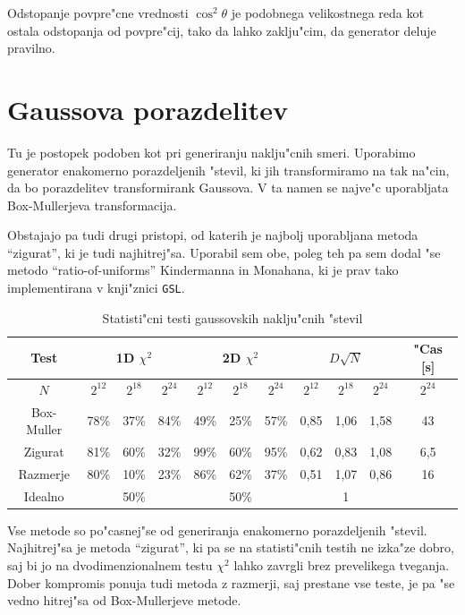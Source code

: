 \documentclass[a4paper,10pt]{article}
\begin{document}
Odstopanje povpre"cne vrednosti $\cos^2\theta$ je podobnega velikostnega reda kot ostala odstopanja od povpre"cij, tako da lahko zaklju"cim, da generator deluje pravilno. 

\section{Gaussova porazdelitev}

Tu je postopek podoben kot pri generiranju naklju"cnih smeri. Uporabimo generator enakomerno porazdeljenih "stevil, ki jih transformiramo na tak na"cin, da bo porazdelitev transformirank Gaussova. V ta namen se najve"c uporabljata Box-Mullerjeva transformacija.

Obstajajo pa tudi drugi pristopi, od katerih je najbolj uporabljana metoda ``zigurat'', ki je tudi najhitrej"sa. Uporabil sem obe, poleg teh pa sem dodal "se metodo ``ratio-of-uniforms'' Kindermanna in Monahana, ki je prav tako implementirana v knji"znici \texttt{GSL}. 

\begin{table}[h]
 \centering
  \begin{tabular}{|c|c|c|c|c|c|c|c|c|c|c|}
  \hline
  Test & \multicolumn{3}{|c|}{1D $\chi^2$} & \multicolumn{3}{|c|}{2D $\chi^2$} & \multicolumn{3}{|c|}{$D\sqrt{N}$} & "Cas [s]\\
  \hline
  $N$ & $2^{12}$ & $2^{18}$ & $2^{24}$ & $2^{12}$ & $2^{18}$ & $2^{24}$ & $2^{12}$ & $2^{18}$ & $2^{24}$ & $2^{24}$ \\
  \hline
  Box-Muller & 78\% & 37\% & 84\% & 49\% & 25\% & 57\% & 0,85 & 1,06 & \cellcolor{red} 1,58 & 43 \\
  Zigurat & 81\% & 60\% & 32\% & \cellcolor{red} 99\% & 60\% & \cellcolor{red} 95\% & 0,62 & 0,83 & 1,08 & 6,5 \\
  Razmerje & 80\% & 10\% & 23\% & 86\% & 62\% & 37\% & 0,51 & 1,07 & 0,86 & 16 \\
\hline
  Idealno & \multicolumn{3}{|c|}{50\%} & \multicolumn{3}{|c|}{50\%} & \multicolumn{3}{|c|}{1} & \\
\hline
   
  \end{tabular}
\caption{Statisti"cni testi gaussovskih naklju"cnih "stevil}
\end{table}

Vse metode so po"casnej"se od generiranja enakomerno porazdeljenih "stevil. Najhitrej"sa je metoda ``zigurat'', ki pa se na statisti"cnih testih ne izka"ze dobro, saj bi jo na dvodimenzionalnem testu $\chi^2$ lahko zavrgli brez prevelikega tveganja. Dober kompromis ponuja tudi metoda z razmerji, saj prestane vse teste, je pa "se vedno hitrej"sa od Box-Mullerjeve metode. 
\end{document}
